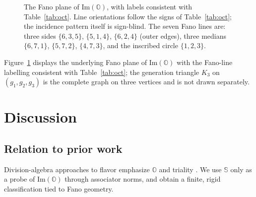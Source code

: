 \documentclass[12pt,a4paper]{article}
\begin{document}
\begin{figure}[htbp]
\centering
{}
\caption{The Fano plane of $\mathrm{Im}(\mathbb{O})$, with labels consistent with Table~\ref{tab:oct}. Line orientations follow the signs of Table~\ref{tab:oct}; the incidence pattern itself is sign-blind. The seven Fano lines are: three sides $\{6,3,5\}$, $\{5,1,4\}$, $\{6,2,4\}$ (outer edges), three medians $\{6,7,1\}$, $\{5,7,2\}$, $\{4,7,3\}$, and the inscribed circle $\{1,2,3\}$.}
\label{fig:fano}
\end{figure}

\noindent Figure~\ref{fig:fano} displays the underlying Fano plane of $\mathrm{Im}(\mathbb{O})$ with the Fano-line labelling consistent with Table~\ref{tab:oct}; the generation triangle $K_3$ on $(g_1, g_2, g_3)$ is the complete graph on three vertices and is not drawn separately.

\section{Discussion}\label{sec:discuss}
\subsection{Relation to prior work}\label{sec:relation-prior-work}
Division-algebra approaches to flavor emphasize $\mathbb{O}$ and triality \cite{Baez2002,Boyle2020,Furey2018,Dixon1994book}.
We use $\mathbb{S}$ only as a probe of $\mathrm{Im}(\mathbb{O})$ through associator norms, and obtain a finite, rigid classification tied to Fano geometry.
\end{document}
